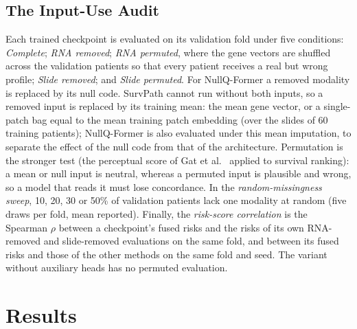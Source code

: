 \documentclass[journal]{IEEEtran}
\newcommand{\pq}{NullQ-Former}
\begin{document}
\subsection{The Input-Use Audit}
\label{sec:audit-setup}
Each trained checkpoint is evaluated on its validation fold under five conditions: \emph{Complete}; \emph{RNA removed}; \emph{RNA permuted}, where the gene vectors are shuffled across the validation patients so that every patient receives a real but wrong profile; \emph{Slide removed}; and \emph{Slide permuted}. For \pq{} a removed modality is replaced by its null code. SurvPath cannot run without both inputs, so a removed input is replaced by its training mean: the mean gene vector, or a single-patch bag equal to the mean training patch embedding (over the slides of 60 training patients); \pq{} is also evaluated under this mean imputation, to separate the effect of the null code from that of the architecture. Permutation is the stronger test (the perceptual score of Gat et al.~\cite{gat2021perceptual} applied to survival ranking): a mean or null input is neutral, whereas a permuted input is plausible and wrong, so a model that reads it must lose concordance. In the \emph{random-missingness sweep}, 10, 20, 30 or 50\% of validation patients lack one modality at random (five draws per fold, mean reported). Finally, the \emph{risk-score correlation} is the Spearman $\rho$ between a checkpoint's fused risks and the risks of its own RNA-removed and slide-removed evaluations on the same fold, and between its fused risks and those of the other methods on the same fold and seed. The variant without auxiliary heads has no permuted evaluation.

\section{Results}
\label{sec:results}
\end{document}
